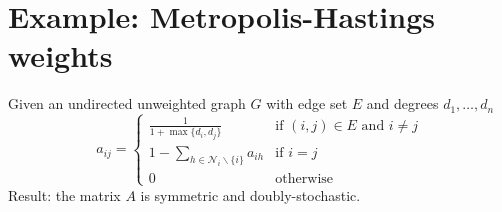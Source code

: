 \documentclass{book}
\theoremstyle{definition}
\theoremstyle{remark}
\theoremstyle{remark}
\theoremstyle{definition}
\begin{document}
\section{Example: Metropolis-Hastings weights}
Given an undirected unweighted graph $G$ with edge set $E$ and degrees $d_1,\dots,d_n$
\[
    a_{ij} = \begin{cases}
        \displaystyle\frac{1}{1+\max\{d_i,d_j\}} & \text{if } (i,j)\in E \text{ and } i\neq j\\
        1- \displaystyle\sum_{h\in\mathcal{N}_i \backslash \{i\}}^{} a_{ih} & \text{if } i=j\\ 
        0 & \text{otherwise}
    \end{cases}
\]
Result: the matrix $A$ is symmetric and doubly-stochastic.
\end{document}
